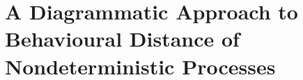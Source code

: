 \chapter{A Diagrammatic Approach to Behavioural Distance of Nondeterministic Processes}
\label{chapter3}

